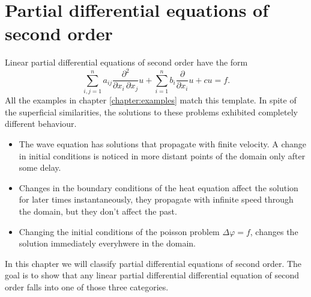 %
%
%
\chapter{Partial differential equations of second order
\label{chapter:2ndorder}}
Linear partial differential equations of second order have the form
\begin{equation}
\sum_{i,j=1}^na_{ij}\frac{\partial^2}{\partial x_i\,\partial x_j} u
+
\sum_{i=1}^nb_i\frac{\partial}{\partial x_i} u+cu=f.
\label{operator2ordnung}
\end{equation}
All the examples in chapter
\ref{chapter:examples}
match this template.
In spite of the superficial similarities, the solutions to these problems
exhibited completely different behaviour.
\begin{itemize}
\item The wave equation has solutions that propagate with finite 
velocity.
A change in initial conditions is noticed in more distant points of
the domain only after some delay.
\item
Changes in the boundary conditions of the heat equation affect the solution
for later times instantaneously, they propagate with infinite speed through
the domain, but they don't affect the past.
\item
Changing the initial conditions of the poisson problem
$\Delta \varphi=f$,
changes the solution immediately everyhwere in the domain.
\end{itemize}
In this chapter we will classify partial differential equations of
second order.
The goal is to show that any linear partial differential differential
equation of second order falls into one of those three categories.







